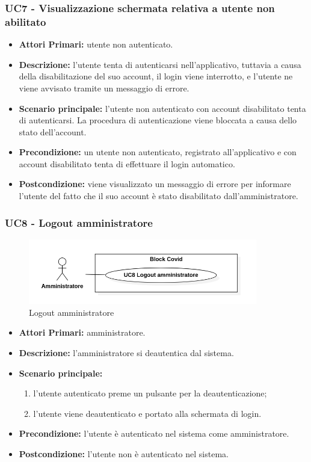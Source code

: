 \subsubsection{ UC7 - Visualizzazione schermata relativa a utente non abilitato}
\begin{itemize}
           	\item\textbf{Attori Primari:} utente non autenticato.
           	\item\textbf{Descrizione:} l'utente tenta di autenticarsi nell'applicativo, tuttavia a causa della disabilitazione del suo account, il login viene interrotto, e
           	l'utente ne viene avvisato tramite un messaggio di errore.
           	\item\textbf{Scenario principale:} l’utente non autenticato con account disabilitato tenta di autenticarsi. 
           	La procedura di autenticazione viene bloccata a causa dello stato dell'account.
           	\item\textbf{Precondizione:} un utente non autenticato, registrato all'applicativo e con account disabilitato tenta di effettuare il login automatico. 
           	\item\textbf{Postcondizione:} viene visualizzato un messaggio di errore per informare l'utente del fatto che il suo account è stato disabilitato dall'amministratore.
\end{itemize}

\subsubsection{ UC8 - Logout amministratore}
\begin{figure}[H]
	\centering
	\includegraphics[width=10cm]{res/images/UC8.png}
	\caption{Logout amministratore}
\end{figure}
\begin{itemize}
	\item\textbf{Attori Primari:} 
	amministratore.
	\item\textbf{Descrizione:} 
	l'amministratore si deautentica dal sistema.
	\item\textbf{Scenario principale:} 
	\begin{enumerate}
		\item l'utente autenticato preme un pulsante per la deautenticazione;
		\item l'utente viene deautenticato e portato alla schermata di login.
	\end{enumerate}
	\item\textbf{Precondizione:} 
	l'utente è autenticato nel sistema come amministratore.
	\item\textbf{Postcondizione:}
	l'utente non è autenticato nel sistema.
\end{itemize}

